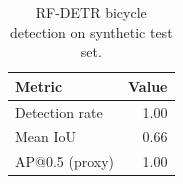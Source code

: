 \begin{table}[t]
\centering
\caption{RF-DETR bicycle detection on synthetic test set.}
\begin{tabular}{lr}
\toprule
Metric & Value \\
\midrule
Detection rate & 1.00 \\
Mean IoU & 0.66 \\
AP@0.5 (proxy) & 1.00 \\
\bottomrule
\end{tabular}
\end{table}